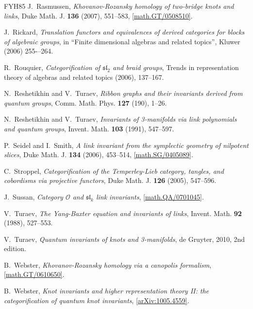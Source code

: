 \documentclass{compositio}
\theoremstyle{definition}
\numberwithin{equation}{section}
\begin{document}
\begin{thebibliography}{FYH{\etalchar{+}}85}
J.~Rasmussen, \emph{Khovanov-{R}ozansky homology of two-bridge knots and links},
  Duke Math. J. \textbf{136} (2007), 551--583,
  \href{http://arxiv.org/abs/math/0508510}{[math.GT/0508510]}.
  
J.~Rickard, \emph{Translation functors and equivalences of derived categories for blocks of algebraic groups}, in “Finite dimensional algebras and related topics”, Kluwer (2006) 255-–264.

R.~Rouquier, \emph{Categorification of {$\mathfrak{sl}_{2}$} and braid groups},
  Trends in representation theory of algebras and related topics (2006),
  137--167.

N.~Reshetikhin and V.~Turaev, \emph{Ribbon graphs and their invariants derived
  from quantum groups}, Comm. Math. Phys. \textbf{127} (190), 1--26.

N.~Reshetikhin and V.~Turaev, \emph{Invariants of 3-manifolds via link polynomials and quantum
  groups}, Invent. Math. \textbf{103} (1991), 547--597.

P.~Seidel and I.~Smith, \emph{A link invariant from the symplectic geometry of
  nilpotent slices}, Duke Math. J. \textbf{134} (2006), 453--514,
  \href{http://arxiv.org/abs/math/0405089}{[math.SG/0405089]}.

C.~Stroppel, \emph{Categorification of the {T}emperley-{L}ieb category,
  tangles, and cobordisms via projective functors}, Duke Math. J. \textbf{126}
  (2005), 547--596.

J.~Sussan, \emph{Category {$\mathcal O$} and {$\mathfrak{sl}_k$} link
  invariants}, \href{http://arxiv.org/abs/math/0701045}{[math.QA/0701045]}.

V.~Turaev, \emph{The {Y}ang-{B}axter equation and invariants of links}, Invent.
  Math. \textbf{92} (1988), 527--553.

V.~Turaev, \emph{Quantum invariants of knots and 3-manifolds}, de Gruyter, 2010,
  2nd edition.

B.~Webster, \emph{Khovanov-Rozansky homology via a canopolis formalism},
  \href{http://arxiv.org/abs/math/0610650}{[math.GT/0610650]}.

B.~Webster, \emph{Knot invariants and higher representation theory {II}: the
  categorification of quantum knot invariants},
  \href{http://arxiv.org/abs/1005.4559}{[arXiv:1005.4559]}.


\end{thebibliography}
\end{document}

